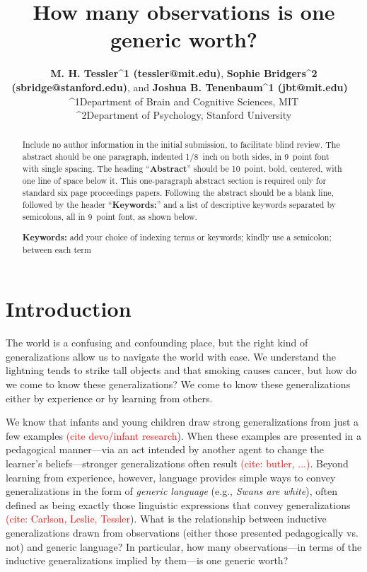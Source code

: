 \documentclass[10pt,letterpaper]{article}
\title{How many observations is one generic worth?}
\author{{\large \bf M. H. Tessler^{1} (tessler@mit.edu)}, {\large \bf Sophie Bridgers^{2} (sbridge@stanford.edu)}, and {\large \bf Joshua B. Tenenbaum^{1} (jbt@mit.edu)} \ \\
  ^{1}Department of Brain and Cognitive Sciences, MIT \\
    ^{2}Department of Psychology, Stanford University}
\newcommand{\red}[1]{\textcolor{Red}{#1}}
\begin{document}
\maketitle


\begin{abstract}
Include no author information in the initial submission, to facilitate
blind review.  The abstract should be one paragraph, indented 1/8~inch on both sides,
in 9~point font with single spacing. The heading ``{\bf Abstract}''
should be 10~point, bold, centered, with one line of space below
it. This one-paragraph abstract section is required only for standard
six page proceedings papers. Following the abstract should be a blank
line, followed by the header ``{\bf Keywords:}'' and a list of
descriptive keywords separated by semicolons, all in 9~point font, as
shown below.

\textbf{Keywords:} 
add your choice of indexing terms or keywords; kindly use a
semicolon; between each term
\end{abstract}


\section{Introduction}

The world is a confusing and confounding place, but the right kind of generalizations allow us to navigate the world with ease.
We understand the lightning tends to strike tall objects and that smoking causes cancer, but how do we come to know these generalizations?
We come to know these generalizations either by experience or by learning from others.

We know that infants and young children draw strong generalizations from just a few examples \red{(cite devo/infant research}).
When these examples are presented in a pedagogical manner---via an act intended by another agent to change the learner's beliefs---stronger generalizations often result \red{(cite: butler, ...)}. 
Beyond learning from experience, however, language provides simple ways to convey generalizations in the form of \emph{generic language} (e.g., \emph{Swans are white}), often defined as being exactly those linguistic expressions that convey generalizations \red{(cite: Carlson, Leslie, Tessler}).
What is the relationship between inductive generalizations drawn from observations (either those presented pedagogically vs. not) and generic language?
In particular, how many observations---in terms of the inductive generalizations implied by them---is one generic worth?
\end{document}
